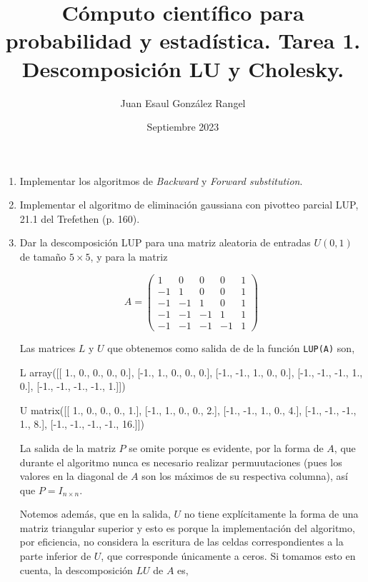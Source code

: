 \documentclass{article}
\title{Cómputo científico para probabilidad y estadística. Tarea 1.\\
Descomposición LU y Cholesky.}
\author{Juan Esaul González Rangel}
\date{Septiembre 2023}
\begin{document}
\maketitle


\begin{enumerate}

    \item Implementar los algoritmos de \textit{Backward} y \textit{Forward substitution}.

    \item Implementar el algoritmo de eliminación gaussiana con pivotteo parcial LUP, 21.1 del Trefethen (p. 160).

    \item Dar la descomposición LUP para una matriz aleatoria de entradas $U (0, 1)$ de tamaño $5 \times 5$, y para la matriz

    \begin{equation}
        A = \begin{pmatrix}
            1 & 0 & 0 & 0 & 1 \\
            -1 & 1 & 0 & 0 & 1 \\
            -1 & -1 & 1 & 0 & 1 \\
            -1 & -1 & -1 & 1 & 1 \\
            -1 & -1 & -1 & -1 & 1
        \end{pmatrix}
    \end{equation}

    

    Las matrices $L$ y $U$ que obtenemos como salida de de la función \texttt{LUP(A)}  son,

\begin{verbatim*}
L
array([[ 1.,  0.,  0.,  0.,  0.],
       [-1.,  1.,  0.,  0.,  0.],
       [-1., -1.,  1.,  0.,  0.],
       [-1., -1., -1.,  1.,  0.],
       [-1., -1., -1., -1.,  1.]])

U
matrix([[ 1.,  0.,  0.,  0.,  1.],
        [-1.,  1.,  0.,  0.,  2.],
        [-1., -1.,  1.,  0.,  4.],
        [-1., -1., -1.,  1.,  8.],
        [-1., -1., -1., -1., 16.]])
\end{verbatim*}

    La salida de la matriz $P$ se omite porque es evidente, por la forma de $A$, que
    durante el algoritmo nunca es necesario realizar permuutaciones (pues los valores
    en la diagonal de $A$ son los máximos de su respectiva columna), así que $P=I_{n\times n}$.

    Notemos además, que en la salida, $U$ no tiene explícitamente la forma de una matriz
    triangular superior y esto es porque la implementación del algoritmo, por eficiencia,
    no considera la escritura de las celdas correspondientes a la parte inferior de $U$,
    que corresponde únicamente a ceros. Si tomamos esto en cuenta, la descomposición $LU$
    de $A$ es,


\end{enumerate}
\end{document}
